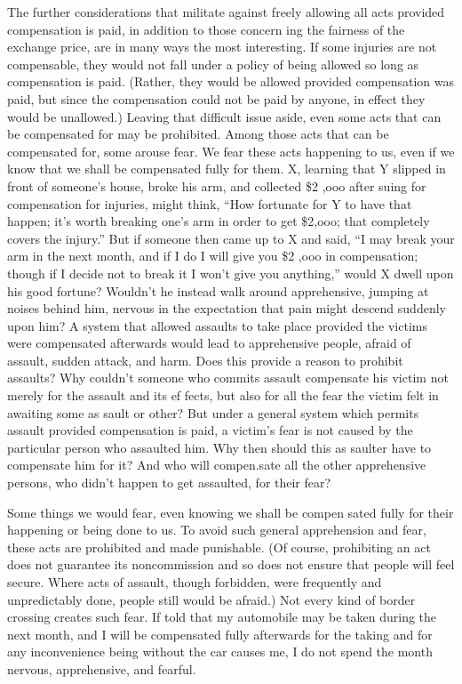 \documentclass[11pt,openany]{book}
\begin{document}
The further considerations that militate against freely allowing all acts provided compensation is paid, in addition to those concern ing the fairness of the exchange price, are in many ways the most interesting. If some injuries are not compensable, they would not fall under a policy of being allowed so long as compensation is paid. (Rather, they would be allowed provided compensation was paid, but since the compensation could not be paid by anyone, in effect they would be unallowed.) Leaving that difficult issue aside, even some acts that can be compensated for may be prohibited. Among those acts that can be compensated for, some arouse fear. We fear these acts happening to us, even if we know that we shall be compensated fully for them. X, learning that Y slipped in front of someone's house, broke his arm, and collected \$2 ,ooo after suing for compensation for injuries, might think, ``How fortunate for Y to have that happen; it's worth breaking one's arm in order to get \$2,ooo; that completely covers the injury.'' But if someone then came up to X and said, ``I may break your arm in the next month, and if I do I will give you \$2 ,ooo in compensation; though if I decide not to break it I won't give you anything,'' would X dwell upon his good fortune? Wouldn't he instead walk around apprehensive, jumping at noises behind him, nervous in the expectation that pain might descend suddenly upon him? A system that allowed assaults to take place provided the victims were compensated afterwards would lead to apprehensive people, afraid of assault, sudden attack, and harm. Does this provide a reason to prohibit assaults? Why couldn't someone who commits assault compensate his victim not merely for the assault and its ef fects, but also for all the fear the victim felt in awaiting some as sault or other? But under a general system which permits assault provided compensation is paid, a victim's fear is not caused by the particular person who assaulted him. Why then should this as saulter have to compensate him for it? And who will compen.sate all the other apprehensive persons, who didn't happen to get assaulted, for their fear? 

Some things we would fear, even knowing we shall be compen sated fully for their happening or being done to us. To avoid such general apprehension and fear, these acts are prohibited and made punishable. (Of course, prohibiting an act does not guarantee its noncommission and so does not ensure that people will feel secure. Where acts of assault, though forbidden, were frequently and unpredictably done, people still would be afraid.) Not every kind of border crossing creates such fear. If told that my automobile may be taken during the next month, and I will be compensated fully afterwards for the taking and for any inconvenience being without the car causes me, I do not spend the month nervous, apprehensive, and fearful. 
\end{document}

